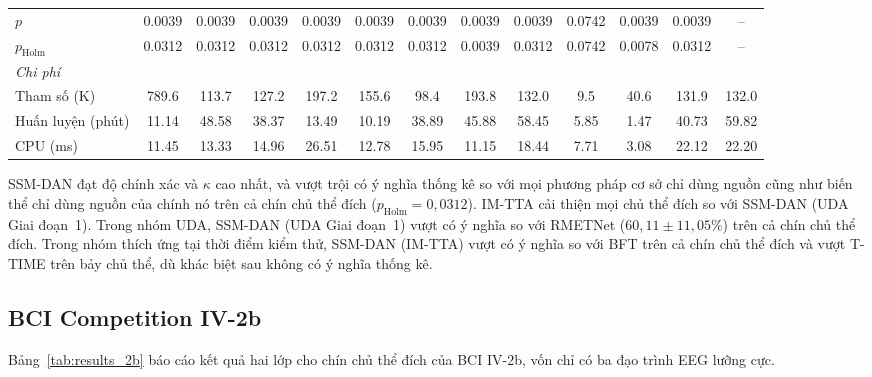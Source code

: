 \documentclass[preprint,12pt]{elsarticle}
\begin{document}
\begin{table}
\begin{adjustbox}{max width=\dimexpr\textheight+80pt\relax}
\begin{tabular}{l@{\hspace{6pt}}cccccc@{\hspace{6pt}}cc@{\hspace{6pt}}ccc@{\hspace{6pt}}c}
\midrule
$p$ & 0.0039 & 0.0039 & 0.0039 & 0.0039 & 0.0039 & 0.0039 & 0.0039 & 0.0039 & 0.0742 & 0.0039 & 0.0039 & -- \\
$p_\mathrm{Holm}$ & 0.0312 & 0.0312 & 0.0312 & 0.0312 & 0.0312 & 0.0312 & 0.0039 & 0.0312 & 0.0742 & 0.0078 & 0.0312 & -- \\
\midrule
\multicolumn{13}{l}{\textit{Chi phí}} \\
Tham số (K) & 789.6 & 113.7 & 127.2 & 197.2 & 155.6 & 98.4 & 193.8 & 132.0 & 9.5 & 40.6 & 131.9 & 132.0 \\
Huấn luyện (phút) & 11.14 & 48.58 & 38.37 & 13.49 & 10.19 & 38.89 & 45.88 & 58.45 & 5.85 & 1.47 & 40.73 & 59.82 \\
CPU (ms) & 11.45 & 13.33 & 14.96 & 26.51 & 12.78 & 15.95 & 11.15 & 18.44 & 7.71 & 3.08 & 22.12 & 22.20 \\
\bottomrule
\end{tabular}
\end{adjustbox}
\end{table}

SSM-DAN đạt độ chính xác và $\kappa$ cao nhất, và vượt trội có ý nghĩa thống kê so với mọi phương pháp cơ sở chỉ dùng nguồn cũng như biến thể chỉ dùng nguồn của chính nó trên cả chín chủ thể đích ($p_\mathrm{Holm}=0,0312$). IM-TTA cải thiện mọi chủ thể đích so với SSM-DAN (UDA Giai đoạn~1). Trong nhóm UDA, SSM-DAN (UDA Giai đoạn~1) vượt có ý nghĩa so với RMETNet ($60,11\pm11,05\%$) trên cả chín chủ thể đích. Trong nhóm thích ứng tại thời điểm kiểm thử, SSM-DAN (IM-TTA) vượt có ý nghĩa so với BFT trên cả chín chủ thể đích và vượt T-TIME trên bảy chủ thể, dù khác biệt sau không có ý nghĩa thống kê.


\subsection{BCI Competition IV-2b}
\label{subsec:results_2b}

Bảng~\ref{tab:results_2b} báo cáo kết quả hai lớp cho chín chủ thể đích của BCI IV-2b, vốn chỉ có ba đạo trình EEG lưỡng cực.
\end{document}
